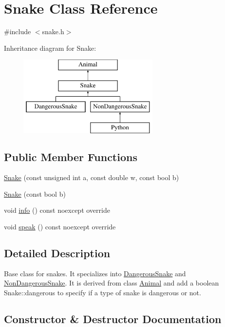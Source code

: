 \hypertarget{classSnake}{}\section{Snake Class Reference}
\label{classSnake}


{\ttfamily \#include $<$snake.\+h$>$}

Inheritance diagram for Snake\+:\begin{figure}[H]
\begin{center}
\leavevmode
\includegraphics[height=4.000000cm]{classSnake}
\end{center}
\end{figure}
\subsection*{Public Member Functions}
\begin{DoxyCompactItemize}
\item 
\hyperlink{classSnake_a57f45c42d54f744517283ed5411f01d7}{Snake} (const unsigned int a, const double w, const bool b)
\item 
\hyperlink{classSnake_a3155ff2573c745c17c8b8ca8b90b5926}{Snake} (const bool b)
\item 
void \hyperlink{classSnake_a502e4a95caef8a4220527a31cc67d8dc}{info} () const noexcept override
\item 
void \hyperlink{classSnake_ade354a78eec6fbf9c3d72a519089c65d}{speak} () const noexcept override
\end{DoxyCompactItemize}


\subsection{Detailed Description}
Base class for snakes. It specializes into \hyperlink{classDangerousSnake}{Dangerous\+Snake} and \hyperlink{classNonDangerousSnake}{Non\+Dangerous\+Snake}. It is derived from class \hyperlink{classAnimal}{Animal} and add a boolean Snake\+::dangerous to specify if a type of snake is dangerous or not. 

\subsection{Constructor \& Destructor Documentation}
\mbox{\label{classSnake_a57f45c42d54f744517283ed5411f01d7}} 
